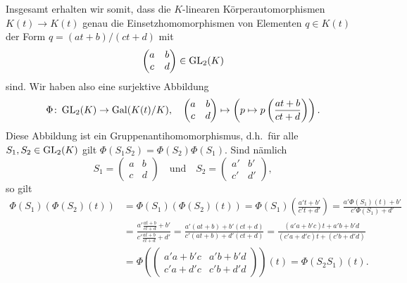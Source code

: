 \documentclass[a4paper,10pt,numbers=noenddot]{scrartcl}
\begin{document}
Insgesamt erhalten wir somit, dass die $K$-linearen Körperautomorphismen $K(t) \to K(t)$ genau die Einsetzhomomorphismen von Elementen $q \in K(t)$ der Form $q = (at+b)/(ct+d)$ mit
\[
  \begin{pmatrix}
    a & b
    \\
    c & d
  \end{pmatrix}
  \in
  \operatorname{GL}_2(K)
\]
sind.
Wir haben also eine surjektive Abbildung
\[
          \Phi
  \colon  \operatorname{GL}_2(K)
  \to     \operatorname{Gal}(K(t) / K),
  \quad
          \begin{pmatrix}
            a & b
            \\
            c & d
          \end{pmatrix}
          \mapsto
          \left(
                    p
            \mapsto p\left( \frac{at+b}{ct+d} \right)
          \right).
\]
Diese Abbildung ist ein Gruppenantihomomorphismus, d.h.\ für alle $S_1, S_2 \in \operatorname{GL}_2(K)$ gilt $\Phi(S_1 S_2) = \Phi(S_2) \Phi(S_1)$.
Sind nämlich
\[
    S_1
  = \begin{pmatrix}
      a & b
      \\
      c & d
    \end{pmatrix}
  \quad
  \text{und}
  \quad
    S_2
  = \begin{pmatrix}
      a'  & b'
      \\
      c'  & d'
    \end{pmatrix},
\]
so gilt
\begin{align*}
      \Phi(S_1)\left( \Phi(S_2)(t) \right)  
  &=  \Phi(S_1)( \Phi(S_2)(t) )
  =   \Phi(S_1)\left( \frac{a' t + b'}{c' t + d'} \right)
  =   \frac{a' \Phi(S_1)(t) + b'}{c' \Phi(S_1 ) + d'}
  \\
  &=  \frac{a' \frac{a t + b}{c t + d} + b'}{c' \frac{a t + b}{c t + d} + d'}
  =   \frac{a'(at+b) + b'(ct+d)}{c'(at+b) + d'(ct+d)}
  =   \frac{(a'a + b'c)t + a'b + b'd}{(c'a + d'c)t  + (c'b + d'd)}
  \\
  &=  \Phi\left(
            \begin{pmatrix}
              a'a + b'c & a'b + b'd
              \\
              c'a + d'c & c'b + d'd
            \end{pmatrix}
          \right)(t)
  =   \Phi(S_2 S_1)(t).
\end{align*}
\end{document}
